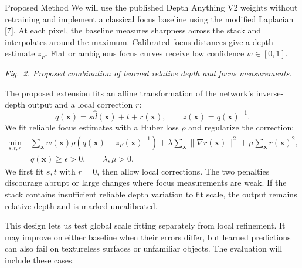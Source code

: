 \documentclass[11pt]{article}
\newcommand{\captext}[1]{{\fontsize{8.5}{10}\selectfont\itshape #1\par}}
\begin{document}
\newpage
\begin{proposalbox}{Proposed Method}
We will use the published Depth Anything V2 weights without retraining and implement a classical focus baseline using the modified Laplacian [7]. At each pixel, the baseline measures sharpness across the stack and interpolates around the maximum. Calibrated focus distances give a depth estimate $z_F$. Flat or ambiguous focus curves receive low confidence $w\in[0,1]$.

\begin{center}
\end{center}
\captext{Fig.~2. Proposed combination of learned relative depth and focus measurements.}

The proposed extension fits an affine transformation of the network's inverse-depth output and a local correction $r$:
\[
q(\mathbf{x})=s\hat d(\mathbf{x})+t+r(\mathbf{x}),\qquad z(\mathbf{x})=q(\mathbf{x})^{-1}.
\]
We fit reliable focus estimates with a Huber loss $\rho$ and regularize the correction:
\[
\begin{aligned}
\min_{s,t,r}\;&\sum_{\mathbf{x}}w(\mathbf{x})\rho\!\left(q(\mathbf{x})-z_F(\mathbf{x})^{-1}\right)
+\lambda\sum_{\mathbf{x}}\|\nabla r(\mathbf{x})\|^2
+\mu\sum_{\mathbf{x}}r(\mathbf{x})^2,\\
& q(\mathbf{x})\geq\epsilon>0,\qquad \lambda,\mu>0.
\end{aligned}
\]
We first fit $s,t$ with $r=0$, then allow local corrections. The two penalties discourage abrupt or large changes where focus measurements are weak. If the stack contains insufficient reliable depth variation to fit scale, the output remains relative depth and is marked uncalibrated.

This design lets us test global scale fitting separately from local refinement. It may improve on either baseline when their errors differ, but learned predictions can also fail on textureless surfaces or unfamiliar objects. The evaluation will include these cases.
\end{proposalbox}
\end{document}
